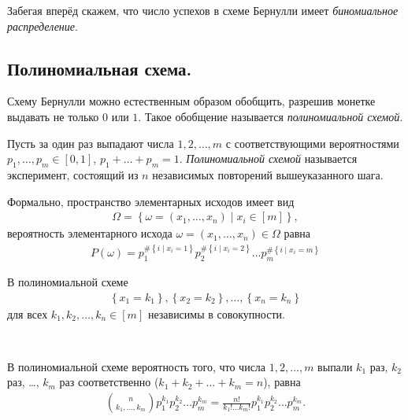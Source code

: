 \documentclass[../main.tex]{subfiles}
\begin{document}
Забегая вперёд скажем, что число успехов в схеме Бернулли имеет \textit{биномиальное распределение}.

\subsection{Полиномиальная схема.}

Схему Бернулли можно естественным образом обобщить, разрешив монетке выдавать не только $ 0 $ или $ 1 $. Такое обобщение называется \textit{полиномиальной схемой}.
\begin{df}
 Пусть за один раз выпадают числа $ 1,2, \ldots, m $ с соответствующими вероятностями $p_1, \ldots, p_m \in [0,1]$, $p_1 + \ldots + p_m = 1$. \textit{Полиномиальной схемой} называется эксперимент, состоящий из $ n $ независимых повторений вышеуказанного шага.

 Формально, пространство элементарных исходов имеет вид
 \begin{align*}
  \Omega = \left\{ \omega = (x_1, \ldots, x_n) \mid x_i \in [m] \right\},
 \end{align*} вероятность элементарного исхода $ \omega = (x_1, \ldots, x_n) \in \Omega $ равна
 \begin{align*}
  P(\omega) = p_1^{\# \left\{ i \mid x_i = 1 \right\}} p_2^{\# \left\{ i \mid x_i = 2 \right\}} \ldots p_m^{\# \left\{ i \mid x_i = m \right\}}
 \end{align*} 
\end{df}

\begin{prop}
 В полиномиальной схеме
 \begin{align*}
  \left\{ x_1 = k_1 \right\}, \left\{ x_2=k_2 \right\}, \ldots, \left\{ x_n = k_n \right\}
 \end{align*} для всех $ k_1, k_2, \ldots, k_n \in [m] $ независимы в совокупности.
\end{prop}

\begin{prop}\

 В полиномиальной схеме вероятность того, что числа $ 1,2,\ldots, m $ выпали $ k_1 $ раз, $ k_2 $ раз, \ldots, $ k_m $ раз соответственно ($ k_1 + k_2 + \ldots + k_m=n $), равна
 \begin{align*}
  \binom n {k_1,\ldots,k_m} p_1^{k_1} p_2^{k_2} \ldots p_m^{k_m} = \frac{n!}{k_1! \ldots k_m!} p_1^{k_1} p_2^{k_2} \ldots p_m^{k_m}.
 \end{align*}
\end{prop}
\end{document}
